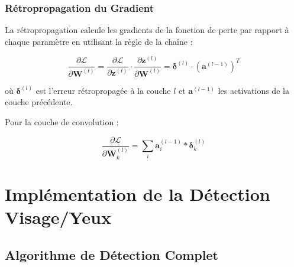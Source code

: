 \documentclass[12pt,a4paper,twoside]{report}
\begin{document}
\subsubsection{Rétropropagation du Gradient}

La rétropropagation calcule les gradients de la fonction de perte par rapport à chaque paramètre en utilisant la règle de la chaîne :

\begin{equation}
\frac{\partial \mathcal{L}}{\partial \mathbf{W}^{(l)}} = \frac{\partial \mathcal{L}}{\partial \mathbf{z}^{(l)}} \cdot \frac{\partial \mathbf{z}^{(l)}}{\partial \mathbf{W}^{(l)}} = \boldsymbol{\delta}^{(l)} \cdot (\mathbf{a}^{(l-1)})^T
\label{eq:backprop}
\end{equation}

où $\boldsymbol{\delta}^{(l)}$ est l'erreur rétropropagée à la couche $l$ et $\mathbf{a}^{(l-1)}$ les activations de la couche précédente.

Pour la couche de convolution :

\begin{equation}
\frac{\partial \mathcal{L}}{\partial \mathbf{W}_k^{(l)}} = \sum_{i} \mathbf{a}_i^{(l-1)} * \boldsymbol{\delta}_k^{(l)}
\label{eq:conv_backprop}
\end{equation}

\section{Implémentation de la Détection Visage/Yeux}

\subsection{Algorithme de Détection Complet}
\end{document}
